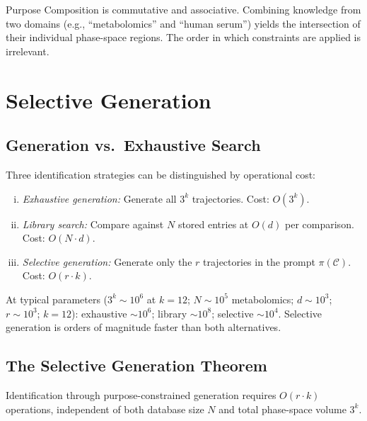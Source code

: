 \begin{remark}
Purpose Composition is commutative and associative.  Combining knowledge from
two domains (e.g., ``metabolomics'' and ``human serum'') yields the
intersection of their individual phase-space regions.  The order in which
constraints are applied is irrelevant.
\end{remark}

\section{Selective Generation}
\label{sec:ch24-selective}

\subsection{Generation vs.\ Exhaustive Search}
\label{sec:ch24-gen-vs-search}

Three identification strategies can be distinguished by operational cost:
\begin{enumerate}[(i)]
  \item \emph{Exhaustive generation:} Generate all $3^k$ trajectories.
    Cost: $O(3^k)$.
  \item \emph{Library search:} Compare against $N$ stored entries at $O(d)$
    per comparison.  Cost: $O(N \cdot d)$.
  \item \emph{Selective generation:} Generate only the $r$ trajectories in the
    prompt $\pi(\mathcal{C})$.  Cost: $O(r \cdot k)$.
\end{enumerate}

At typical parameters ($3^k \sim 10^6$ at $k=12$; $N \sim 10^5$ metabolomics;
$d \sim 10^3$; $r \sim 10^3$; $k = 12$): exhaustive $\sim 10^6$; library
$\sim 10^8$; selective $\sim 10^4$.  Selective generation is orders of magnitude
faster than both alternatives.

\subsection{The Selective Generation Theorem}
\label{sec:ch24-selective-thm}

\begin{theorem}
\label{thm:ch24-selective}
Identification through purpose-constrained generation requires $O(r \cdot k)$
operations, independent of both database size $N$ and total phase-space
volume $3^k$.
\end{theorem}


